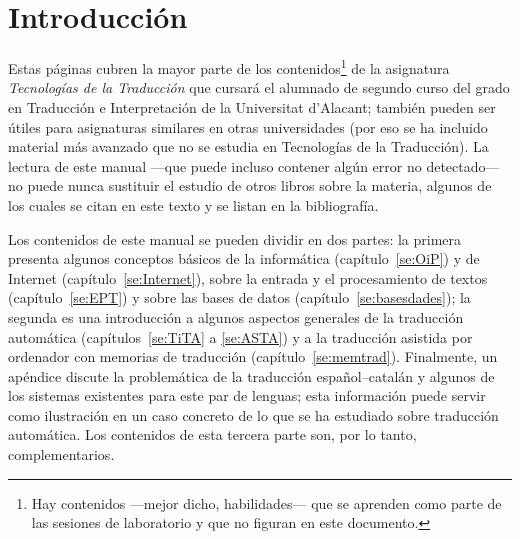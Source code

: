 \chapter{Introducción} 

Estas páginas cubren la mayor parte de los contenidos\footnote{Hay contenidos ---mejor dicho, habilidades--- que se aprenden como parte de las sesiones de laboratorio y que no figuran en este documento.} de la asignatura \emph{Tecnologías de la Traducción} que cursará el alumnado de segundo curso del grado en Traducción e Interpretación de la Universitat d'Alacant; también pueden ser útiles para asignaturas similares en otras universidades (por eso se  ha incluido material más avanzado que no se estudia en Tecnologías de la Traducción). La lectura de este manual ---que puede incluso contener algún error no detectado--- no puede nunca sustituir el estudio de otros libros sobre la materia, algunos de los cuales se citan en este texto y se listan en la bibliografía. 

Los contenidos de este manual se pueden dividir en dos partes: la primera presenta algunos conceptos básicos de la informática (capítulo~\ref{se:OiP}) y de Internet (capítulo~\ref{se:Internet}), sobre la entrada y el procesamiento de textos (capítulo~\ref{se:EPT}) y sobre las bases de datos (capítulo~\ref{se:basesdades}); la segunda es una introducción a algunos aspectos generales de la traducción automática (capítulos~\ref{se:TiTA} a \ref{se:ASTA}) y a la traducción asistida por ordenador con memorias de traducción (capítulo~\ref{se:memtrad}). Finalmente, un apéndice discute la problemática de la traducción español--catalán y algunos de los sistemas existentes para este par de lenguas; esta información puede servir como ilustración en un caso concreto de lo que se ha estudiado sobre traducción automática. Los contenidos de esta tercera parte son, por lo tanto, complementarios. 

